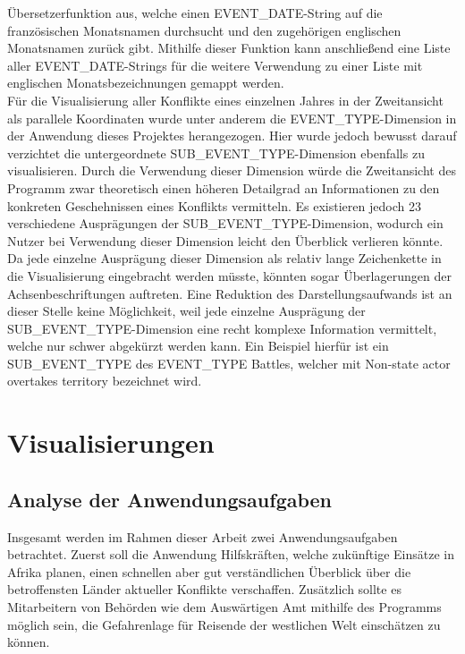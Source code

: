 \documentclass[usegeometry=true]{scrartcl}
\begin{document}
Übersetzerfunktion aus, welche einen EVENT\_DATE-String auf die französischen Monatsnamen durchsucht und den zugehörigen englischen Monatsnamen zurück gibt. Mithilfe dieser Funktion kann anschließend eine Liste aller EVENT\_DATE-Strings für die weitere Verwendung zu einer Liste mit englischen Monatsbezeichnungen gemappt werden.\\ Für die Visualisierung aller Konflikte eines einzelnen Jahres in der Zweitansicht als parallele Koordinaten wurde unter anderem die EVENT\_TYPE-Dimension in der Anwendung dieses Projektes herangezogen. Hier wurde jedoch bewusst darauf verzichtet die untergeordnete SUB\_EVENT\_TYPE-Dimension ebenfalls zu visualisieren. Durch die Verwendung dieser Dimension würde die Zweitansicht des Programm zwar theoretisch einen höheren Detailgrad an Informationen zu den konkreten Geschehnissen eines Konflikts vermitteln. Es existieren jedoch 23 verschiedene Ausprägungen der SUB\_EVENT\_TYPE-Dimension, wodurch ein Nutzer bei Verwendung dieser Dimension leicht den Überblick verlieren könnte. Da jede einzelne Ausprägung dieser Dimension als relativ lange Zeichenkette in die Visualisierung eingebracht werden müsste, könnten sogar Überlagerungen der Achsenbeschriftungen auftreten. Eine Reduktion des Darstellungsaufwands ist an dieser Stelle keine Möglichkeit, weil jede einzelne Ausprägung der SUB\_EVENT\_TYPE-Dimension eine recht komplexe Information vermittelt, welche nur schwer abgekürzt werden kann. Ein Beispiel hierfür ist ein SUB\_EVENT\_TYPE des EVENT\_TYPE \glqq Battles\grqq{}, welcher mit \glqq Non-state actor overtakes territory\grqq{} bezeichnet wird.\\

\section{Visualisierungen}
\subsection{Analyse der Anwendungsaufgaben}

Insgesamt werden im Rahmen dieser Arbeit zwei Anwendungsaufgaben betrachtet. Zuerst soll die Anwendung Hilfskräften, welche zukünftige Einsätze in Afrika planen, einen schnellen aber gut verständlichen Überblick über die betroffensten Länder aktueller Konflikte verschaffen. Zusätzlich sollte es Mitarbeitern von Behörden wie dem Auswärtigen Amt mithilfe des Programms möglich sein, die Gefahrenlage für Reisende der westlichen Welt einschätzen zu können.\\
\end{document}
